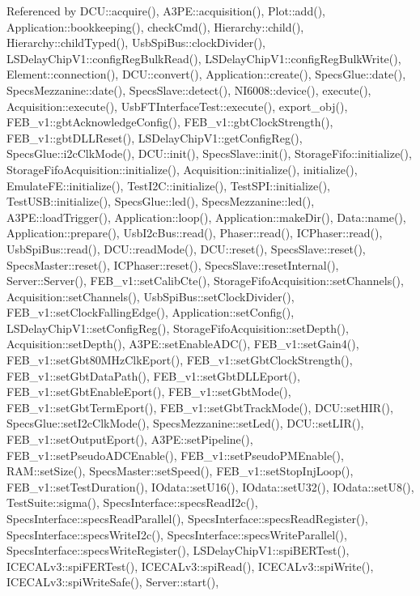Referenced by D\+C\+U\+::acquire(), A3\+P\+E\+::acquisition(), Plot\+::add(), Application\+::bookkeeping(), check\+Cmd(), Hierarchy\+::child(), Hierarchy\+::child\+Typed(), Usb\+Spi\+Bus\+::clock\+Divider(), L\+S\+Delay\+Chip\+V1\+::config\+Reg\+Bulk\+Read(), L\+S\+Delay\+Chip\+V1\+::config\+Reg\+Bulk\+Write(), Element\+::connection(), D\+C\+U\+::convert(), Application\+::create(), Specs\+Glue\+::date(), Specs\+Mezzanine\+::date(), Specs\+Slave\+::detect(), N\+I6008\+::device(), execute(), Acquisition\+::execute(), Usb\+F\+T\+Interface\+Test\+::execute(), export\+\_\+obj(), F\+E\+B\+\_\+v1\+::gbt\+Acknowledge\+Config(), F\+E\+B\+\_\+v1\+::gbt\+Clock\+Strength(), F\+E\+B\+\_\+v1\+::gbt\+D\+L\+L\+Reset(), L\+S\+Delay\+Chip\+V1\+::get\+Config\+Reg(), Specs\+Glue\+::i2c\+Clk\+Mode(), D\+C\+U\+::init(), Specs\+Slave\+::init(), Storage\+Fifo\+::initialize(), Storage\+Fifo\+Acquisition\+::initialize(), Acquisition\+::initialize(), initialize(), Emulate\+F\+E\+::initialize(), Test\+I2\+C\+::initialize(), Test\+S\+P\+I\+::initialize(), Test\+U\+S\+B\+::initialize(), Specs\+Glue\+::led(), Specs\+Mezzanine\+::led(), A3\+P\+E\+::load\+Trigger(), Application\+::loop(), Application\+::make\+Dir(), Data\+::name(), Application\+::prepare(), Usb\+I2c\+Bus\+::read(), Phaser\+::read(), I\+C\+Phaser\+::read(), Usb\+Spi\+Bus\+::read(), D\+C\+U\+::read\+Mode(), D\+C\+U\+::reset(), Specs\+Slave\+::reset(), Specs\+Master\+::reset(), I\+C\+Phaser\+::reset(), Specs\+Slave\+::reset\+Internal(), Server\+::\+Server(), F\+E\+B\+\_\+v1\+::set\+Calib\+Cte(), Storage\+Fifo\+Acquisition\+::set\+Channels(), Acquisition\+::set\+Channels(), Usb\+Spi\+Bus\+::set\+Clock\+Divider(), F\+E\+B\+\_\+v1\+::set\+Clock\+Falling\+Edge(), Application\+::set\+Config(), L\+S\+Delay\+Chip\+V1\+::set\+Config\+Reg(), Storage\+Fifo\+Acquisition\+::set\+Depth(), Acquisition\+::set\+Depth(), A3\+P\+E\+::set\+Enable\+A\+D\+C(), F\+E\+B\+\_\+v1\+::set\+Gain4(), F\+E\+B\+\_\+v1\+::set\+Gbt80\+M\+Hz\+Clk\+Eport(), F\+E\+B\+\_\+v1\+::set\+Gbt\+Clock\+Strength(), F\+E\+B\+\_\+v1\+::set\+Gbt\+Data\+Path(), F\+E\+B\+\_\+v1\+::set\+Gbt\+D\+L\+L\+Eport(), F\+E\+B\+\_\+v1\+::set\+Gbt\+Enable\+Eport(), F\+E\+B\+\_\+v1\+::set\+Gbt\+Mode(), F\+E\+B\+\_\+v1\+::set\+Gbt\+Term\+Eport(), F\+E\+B\+\_\+v1\+::set\+Gbt\+Track\+Mode(), D\+C\+U\+::set\+H\+I\+R(), Specs\+Glue\+::set\+I2c\+Clk\+Mode(), Specs\+Mezzanine\+::set\+Led(), D\+C\+U\+::set\+L\+I\+R(), F\+E\+B\+\_\+v1\+::set\+Output\+Eport(), A3\+P\+E\+::set\+Pipeline(), F\+E\+B\+\_\+v1\+::set\+Pseudo\+A\+D\+C\+Enable(), F\+E\+B\+\_\+v1\+::set\+Pseudo\+P\+M\+Enable(), R\+A\+M\+::set\+Size(), Specs\+Master\+::set\+Speed(), F\+E\+B\+\_\+v1\+::set\+Stop\+Inj\+Loop(), F\+E\+B\+\_\+v1\+::set\+Test\+Duration(), I\+Odata\+::set\+U16(), I\+Odata\+::set\+U32(), I\+Odata\+::set\+U8(), Test\+Suite\+::sigma(), Specs\+Interface\+::specs\+Read\+I2c(), Specs\+Interface\+::specs\+Read\+Parallel(), Specs\+Interface\+::specs\+Read\+Register(), Specs\+Interface\+::specs\+Write\+I2c(), Specs\+Interface\+::specs\+Write\+Parallel(), Specs\+Interface\+::specs\+Write\+Register(), L\+S\+Delay\+Chip\+V1\+::spi\+B\+E\+R\+Test(), I\+C\+E\+C\+A\+Lv3\+::spi\+F\+E\+R\+Test(), I\+C\+E\+C\+A\+Lv3\+::spi\+Read(), I\+C\+E\+C\+A\+Lv3\+::spi\+Write(), I\+C\+E\+C\+A\+Lv3\+::spi\+Write\+Safe(), Server\+::start(), 